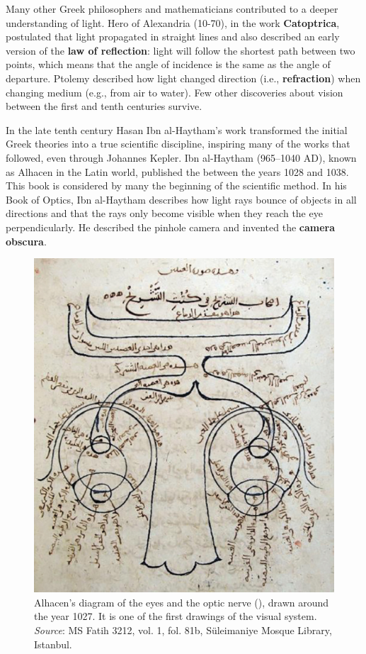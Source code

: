 Many other Greek philosophers and mathematicians 
contributed to a deeper understanding of light. Hero of Alexandria (10-70), in the work \textbf{Catoptrica}, postulated that light propagated in straight lines and also described an early version of the {\bf law of reflection}: light will follow the shortest path between two points, which means that the angle of incidence is the same as the angle of departure. Ptolemy described how light changed direction (i.e., {\bf refraction}) when changing medium (e.g., from air to water). Few other discoveries about vision between the first and tenth centuries survive.



In the late tenth century Hasan Ibn al-Haytham's work transformed the initial Greek theories into a true scientific discipline, inspiring many of the works that followed, even through Johannes Kepler.  Ibn al-Haytham (965--1040 AD), known as Alhacen in the Latin world, published the  \cite{2001alhacen} between the years 1028 and 1038. This book is considered by many the beginning of the scientific method. In his Book of Optics, Ibn al-Haytham describes how light rays bounce of objects in all directions and that the rays only become visible when they reach the eye perpendicularly. He described the pinhole camera and invented the {\bf camera obscura}. 


\begin{figure}[t]
\centerline{
\includegraphics[width=0.5\linewidth]{figures/taxonomy/Alhazen1652.png}
} 
\caption{Alhacen's diagram of the eyes and the optic nerve (), drawn around the year 1027. It is one of the first drawings of the visual system. {\em Source}: MS Fatih 3212, vol. 1, fol. 81b, Süleimaniye Mosque Library, Istanbul.} 
\label{fig:Alhacen}
\end{figure}



